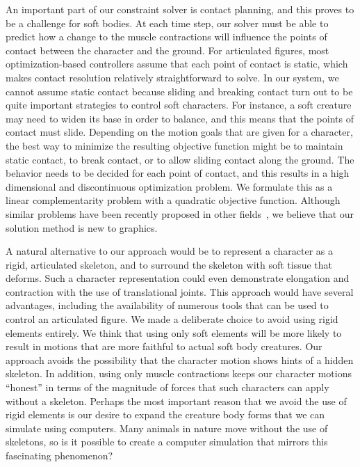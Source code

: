 An important part of our constraint solver is contact planning, and
this proves to be a challenge for soft bodies.  At each time step, our
solver must be able to predict how a change to the muscle contractions
will influence the points of contact between the character and the
ground.  For articulated figures, most optimization-based controllers assume that each point
of contact is static, which makes contact resolution relatively
straightforward to solve.  In our system, we cannot assume static
contact because sliding and breaking contact turn out to be quite
important strategies to control soft characters.  For instance, a soft
creature may need to widen its base in order to balance, and this
means that the points of contact must slide.  Depending on the motion
goals that are given for a character, the best way to minimize the
resulting objective function might be to maintain static contact, to
break contact, or to allow sliding contact along the ground.  The
behavior needs to be decided for each point of contact, and this
results in a high dimensional and discontinuous optimization problem.  We formulate this
as a linear complementarity problem with a quadratic objective
function.  Although similar problems have been recently proposed in
other fields~\cite{Braun:2005,Bai:2011}, we believe that our solution method is new to
graphics.

A natural alternative to our approach would be to represent a character as
a rigid, articulated skeleton, and to surround the skeleton with soft
tissue that deforms.  Such a character representation could even
demonstrate elongation and contraction with the use of translational
joints.  This approach would have several advantages, including the
availability of numerous tools that can be used to control an articulated
figure.  We made a deliberate choice to avoid using rigid elements
entirely.  We think that using only soft elements will be more likely to
result in motions that are more faithful to actual soft body creatures.
Our approach avoids the possibility that the character motion shows hints
of a hidden skeleton.  In addition, using only muscle contractions keeps
our character motions ``honest'' in terms of the magnitude of forces that
such characters can apply without a skeleton.  Perhaps the most important
reason that we avoid the use of rigid elements is our desire to expand the
creature body forms that we can simulate using computers.  Many animals in
nature move without the use of skeletons, so is it possible to create a
computer simulation that mirrors this fascinating phenomenon?

